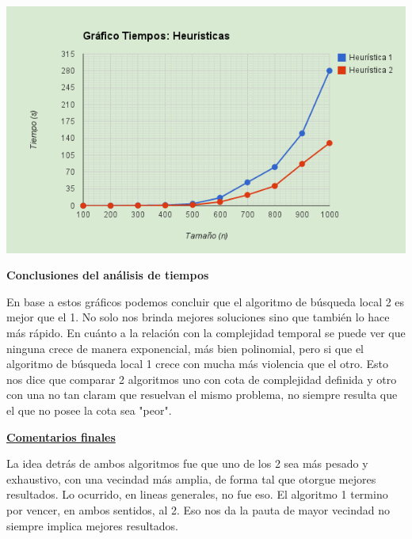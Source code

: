 \documentclass[10pt,a4paper]{article}
\begin{document}
\includegraphics[scale=0.5]{grafico_tiempos_heuristicas.png}

\textbf{Conclusiones del análisis de tiempos}

En base a estos gráficos podemos concluir que el algoritmo de búsqueda local 2 es mejor que el 1. No solo nos brinda mejores soluciones sino que también lo hace más rápido.
En cuánto a la relación con la complejidad temporal se puede ver que ninguna crece de manera exponencial, más bien polinomial, pero si que el algoritmo de búsqueda local 1 crece con mucha más violencia que el otro. Esto nos dice que comparar 2 algoritmos uno con cota de complejidad definida y otro con una no tan claram que resuelvan el mismo problema, no siempre resulta que el que no posee la cota sea "peor".

\noindent \underline{\textbf{Comentarios finales}}

La idea detrás de ambos algoritmos fue que uno de los 2 sea más pesado y exhaustivo, con una vecindad más amplia, de forma tal que otorgue mejores resultados. Lo ocurrido, en lineas generales, no fue eso. El algoritmo 1 termino por vencer, en ambos sentidos, al 2. Eso nos da la pauta de mayor vecindad no siempre implica mejores resultados.
\end{document}

